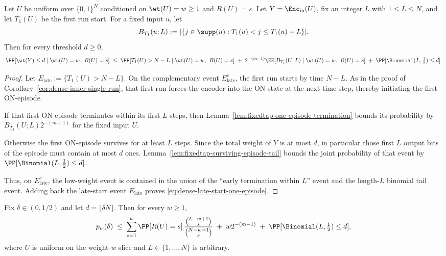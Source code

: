 \begin{lemma}
\label{lem:dense-late-start-one-episode}
Let $U$ be uniform over $\{0,1\}^N$ conditioned on $\wt(U)=w\ge 1$ and $R(U)=s$.
Let $Y=\Enc_{\mathrm{in}}(U)$, fix an integer $L$ with $1\le L\le N$, and let $T_1(U)$ be the first run start.
For a fixed input \(u\), let
\[
B_{T_1}(u;L):=
|\{j\in\supp(u):T_1(u)<j\le T_1(u)+L\}|.
\]
Then for every threshold $d\ge 0$,
\begin{equation}
\label{eq:dense-late-start-one-episode}
\PP[\wt(Y)\le d \mid \wt(U)=w,\ R(U)=s]
\;\le\;
\PP[T_1(U)>N-L \mid \wt(U)=w,\ R(U)=s]
\;+\;
2^{-(m-1)}\EE[B_{T_1}(U;L)\mid \wt(U)=w,\ R(U)=s]
\;+\;
\PP[\Binomial(L,\tfrac12)\le d].
\end{equation}
\end{lemma}

\begin{proof}
Let $E_{\mathrm{late}}:=\{T_1(U)>N-L\}$.
On the complementary event $E_{\mathrm{late}}^c$, the first run starts by time $N-L$.
As in the proof of Corollary~\ref{cor:dense-inner-single-run}, that first run forces the encoder into the ON state at
the next time step, thereby initiating the first ON-episode.

If that first ON-episode terminates within its first $L$ steps, then
Lemma~\ref{lem:fixedtap-one-episode-termination} bounds its probability by
\(B_{T_1}(U;L)2^{-(m-1)}\) for the fixed input \(U\).

Otherwise the first ON-episode survives for at least $L$ steps. Since the total weight of $Y$ is at most $d$, in
particular those first \(L\) output bits of the episode must contain at most \(d\) ones.
Lemma~\ref{lem:fixedtap-surviving-episode-tail} bounds the joint probability of that event by
\(\PP[\Binomial(L,\tfrac12)\le d]\).

Thus, on $E_{\mathrm{late}}^c$, the low-weight event is contained in the union of the ``early termination within $L$''
event and the length-$L$ binomial tail event. Adding back the late-start event $E_{\mathrm{late}}$ proves
\eqref{eq:dense-late-start-one-episode}.
\end{proof}

\begin{corollary}
\label{cor:dense-late-start-slice}
Fix $\delta\in(0,1/2)$ and let $d=\lfloor \delta N\rfloor$.
Then for every $w\ge 1$,
\begin{equation}
\label{eq:dense-late-start-slice}
p_w(\delta)
\;\le\;
\sum_{s=1}^{w}
\PP[R(U)=s]\,
\frac{\binom{L-w+1}{s}}{\binom{N-w+1}{s}}
\;+\;
w2^{-(m-1)}
\;+\;
\PP[\Binomial(L,\tfrac12)\le d],
\end{equation}
where \(U\) is uniform on the weight-\(w\) slice and \(L\in\{1,\dots,N\}\) is arbitrary.
\end{corollary}

